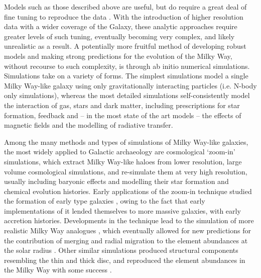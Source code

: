  Models such as those described above are useful, but do require a great deal of fine tuning to reproduce the data \citep[complex models can have greater than 10 free parameters][]{2016arXiv160408613A}. With the introduction of higher resolution data with a wider coverage of the Galaxy, these analytic approaches require greater levels of such tuning, eventually becoming very complex, and likely unrealistic as a result. A potentially more fruitful method of developing robust models and making strong predictions for the evolution of the Milky Way, without recourse to such complexity, is through ab initio numerical simulations. Simulations take on a variety of forms. The simplest simulations model a single Milky Way-like galaxy using only gravitationally interacting particles (i.e. N-body only simulations),  whereas the most detailed simulations self-consistently model the interaction of gas, stars and dark matter, including prescriptions for star formation, feedback and -- in the most state of the art models -- the effects of magnetic fields and the modelling of radiative transfer.
 
 Among the many methods and types of simulations of Milky Way-like galaxies, the most widely applied to Galactic archaeology are cosmological `zoom-in' simulations, which extract Milky Way-like haloes from lower resolution, large volume cosmological simulations, and re-simulate them at very high resolution, usually including baryonic effects and modelling their star formation and chemical evolution histories. Early applications of the zoom-in technique studied the formation of early type galaxies \citep[e.g.][]{1993ApJ...412..455K}, owing to the fact that early implementations of it lended themselves to more massive galaxies, with early accretion histories. Developments in the technique \citep[such as those described in][alongside those in the sub-grid models, as described earlier]{2009ApJ...707..250M} lead to the simulation of more realistic Milky Way analogues \citep[e.g.][]{2012ApJ...756...26M}, which eventually allowed for new predictions for the contribution of merging and radial migration to the element abundances at the solar radius \citep[e.g.][]{2013A&A...558A...9M,2014A&A...572A..92M}. Other similar simulations produced structural components resembling the thin and thick disc, and reproduced the element abundances in the Milky Way with some success \citep{2012MNRAS.426..690B}. 
 
